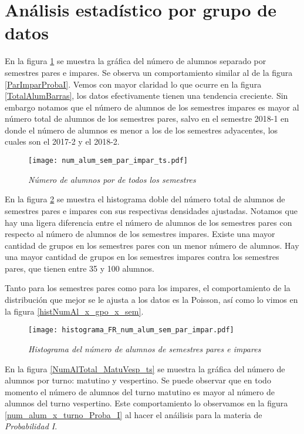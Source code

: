 \section{Análisis estadístico por grupo de datos}

En la figura \ref{NumAlTotal_ParImpar_ts} se muestra la gráfica del número de alumnos separado por semestres pares e impares. Se observa un comportamiento similar al de la figura \ref{ParImparProbaI}. Vemos con mayor claridad lo que ocurre en la figura \ref{TotalAlumBarras}, los datos efectivamente tienen una tendencia creciente. Sin embargo notamos que el número de alumnos de los semestres impares es mayor al número total de alumnos de los semestres pares, salvo en el semestre 2018-1 en donde el número de alumnos es menor a los de los semestres adyacentes, los cuales son el 2017-2 y el 2018-2.

\begin{figure}[H]
\centering
\texttt{[image: num\_alum\_sem\_par\_impar\_ts.pdf]} %
\caption{\textit{Número de alumnos por  de todos los semestres}}\label{NumAlTotal_ParImpar_ts}
\end{figure}


En la figura \ref{histNumAlTotal_ParImpar} se muestra el histograma doble del número total de alumnos de semestres pares e impares con sus respectivas densidades ajustadas. Notamos que hay una ligera diferencia entre el número de alumnos de los semestres pares con respecto al número de alumnos de los semestres impares. Existe una mayor cantidad de grupos en los semestres pares con un menor número de alumnos. Hay una mayor cantidad de grupos en los semestres impares contra los semestres pares, que tienen entre 35 y 100 alumnos.

Tanto para los semestres pares como para los impares, el comportamiento de la distribución que mejor se le ajusta a los datos es la Poisson, así como lo vimos en la figura \ref{histNumAl_x_gpo_x_sem}.

\begin{figure}[H]
\centering
\texttt{[image: histograma\_FR\_num\_alum\_sem\_par\_impar.pdf]} %
\caption{\textit{Histograma del número de alumnos de semestres pares e impares}}\label{histNumAlTotal_ParImpar}
\end{figure}


En la figura \ref{NumAlTotal_MatuVesp_ts} se muestra la gráfica del número de alumnos por turno: matutino y vespertino. Se puede observar que en todo momento el número de alumnos del turno matutino es mayor al número de alumnos del turno vespertino. Este comportamiento lo observamos en la figura \ref{num_alum_x_turno_Proba_I} al hacer el anáilisis para la materia de \textit{Probabilidad I}.

